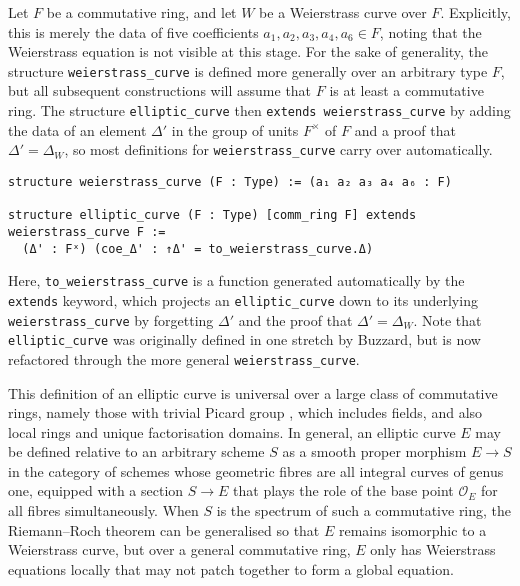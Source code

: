 \documentclass[a4paper,UKenglish,cleveref,autoref,thm-restate]{lipics-v2021}
\begin{document}
Let $ F $ be a commutative ring, and let $ W $ be a Weierstrass curve over $ F $. Explicitly, this is merely the data of five coefficients $ a_1, a_2, a_3, a_4, a_6 \in F $, noting that the Weierstrass equation is not visible at this stage. For the sake of generality, the structure \texttt{weierstrass\_curve} is defined more generally over an arbitrary type $ F $, but all subsequent constructions will assume that $ F $ is at least a commutative ring. The structure \texttt{elliptic\_curve} then \texttt{extends weierstrass\_curve} by adding the data of an element $ \Delta' $ in the group of units $ F^\times $ of $ F $ and a proof that $ \Delta' = \Delta_W $, so most definitions for \texttt{weierstrass\_curve} carry over automatically.
\begin{lstlisting}
structure weierstrass_curve (F : Type) := (a₁ a₂ a₃ a₄ a₆ : F)

structure elliptic_curve (F : Type) [comm_ring F] extends weierstrass_curve F :=
  (Δ' : Fˣ) (coe_Δ' : ↑Δ' = to_weierstrass_curve.Δ)
\end{lstlisting}
Here, \texttt{to\_weierstrass\_curve} is a function generated automatically by the \texttt{extends} keyword, which projects an \texttt{elliptic\_curve} down to its underlying \texttt{weierstrass\_curve} by forgetting $ \Delta' $ and the proof that $ \Delta' = \Delta_W $. Note that \texttt{elliptic\_curve} was originally defined in one stretch by Buzzard, but is now refactored through the more general \texttt{weierstrass\_curve}.

\pagebreak

\begin{remark}
\label{rem}
This definition of an elliptic curve is universal over a large class of commutative rings, namely those with trivial Picard group \cite[Section 2.2]{katz}, which includes fields, and also local rings and unique factorisation domains. In general, an elliptic curve $ E $ may be defined relative to an arbitrary scheme $ S $ as a smooth proper morphism $ E \to S $ in the category of schemes whose geometric fibres are all integral curves of genus one, equipped with a section $ S \to E $ that plays the role of the base point $ \mathcal{O}_E $ for all fibres simultaneously. When $ S $ is the spectrum of such a commutative ring, the Riemann--Roch theorem can be generalised so that $ E $ remains isomorphic to a Weierstrass curve, but over a general commutative ring, $ E $ only has Weierstrass equations locally that may not patch together to form a global equation.
\end{remark}
\end{document}
